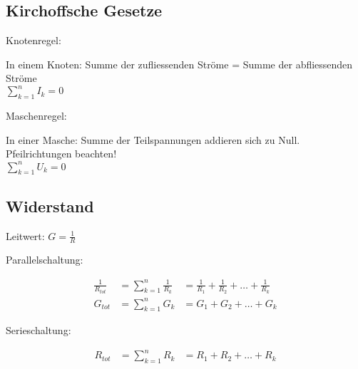 \begin{sectionbox}
	\subsection{Kirchoffsche Gesetze}

	Knotenregel:
	\begin{emphbox}
		In einem Knoten: Summe der zufliessenden Ströme = Summe der abfliessenden Ströme\\
		$\sum _{k=1}^{n}I_k = 0$
	\end{emphbox}
	
	Maschenregel:
	\begin{emphbox}
		In einer Masche: Summe der Teilspannungen addieren sich zu Null. Pfeilrichtungen beachten!\\
		$\sum _{k=1}^{n}U_k = 0$
	\end{emphbox}

\end{sectionbox}


\begin{sectionbox}
	\subsection{Widerstand}

	\begin{emphbox}
	Leitwert:	$ G = \frac{1}{R} $\\
	\end{emphbox}	
	
	Parallelschaltung:
	\begin{emphbox}
		\begin{align*}
			\frac{1}{R_{tot}} &= \sum _{k=1}^{n}\frac{1}{R_k} &= \frac{1}{R_{1}} + \frac{1}{R_{2}} + \ldots + \frac{1}{R_k}\\
			G_{tot} &= \sum _{k=1}^{n}G_k &= G_1 + G_2 + \ldots + G_k
		\end{align*}
	\end{emphbox}
	
	Serieschaltung:
	\begin{emphbox}
			\begin{align*}
			R_{tot} &= \sum _{k=1}^{n}R_k &= R_1 + R_2 + \ldots + R_k
		\end{align*}

	\end{emphbox}

	
\end{sectionbox}


